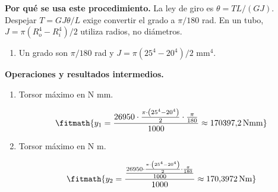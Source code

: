 \noindent\textbf{Por qué se usa este procedimiento.} La ley de giro es $\theta=TL/(GJ)$. Despejar $T=GJ\theta/L$ exige convertir el grado a $\pi/180$ rad. En un tubo, $J=\pi(R_o^4-R_i^4)/2$ utiliza radios, no diámetros.

\begin{enumerate}

\item Un grado son $\pi/180$ rad y $J = \pi(25^4 - 20^4)/2$ mm$^4$.

\end{enumerate}

\noindent\textbf{Operaciones y resultados intermedios.}

\begin{enumerate}

\item Torsor máximo en N mm.

\[\fitmath{y_{1}=\frac{26950\cdot \frac{\pi\cdot \left({25}^{4}-{20}^{4}\right)}{2}\cdot \frac{\pi}{180}}{1000}\approx 170397{,}2\,\mathrm{N mm}}\]

\item Torsor máximo en N m.

\[\fitmath{y_{2}=\frac{\frac{26950\cdot \frac{\pi\cdot \left({25}^{4}-{20}^{4}\right)}{2}\cdot \frac{\pi}{180}}{1000}}{1000}\approx 170{,}3972\,\mathrm{N m}}\]

\end{enumerate}
